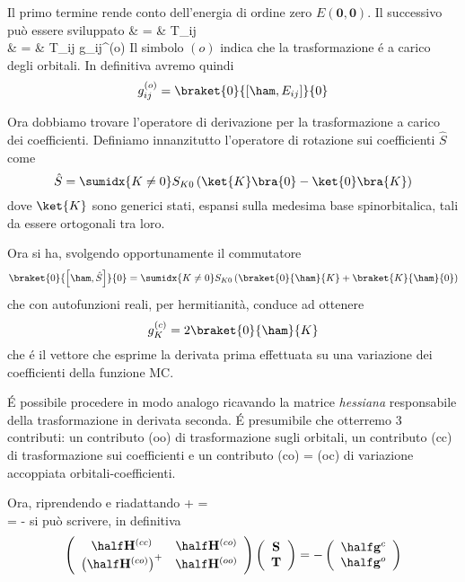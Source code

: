 Il primo termine rende conto dell'energia di ordine zero
$E(\mathbf{0},\mathbf{0})$. Il successivo pu\`o essere sviluppato
\beqas
{} & = &  T_{ij}
 \\
%
& = &  T_{ij} g_{ij}^{(o)}
\eeqas
Il simbolo $(o)$ indica che la trasformazione \'e a carico degli
orbitali.
In definitiva avremo quindi
$$
g_{ij}^{(o)} = \braket{0}{\left[\ham,E_{ij}\right]}{0}
$$

Ora dobbiamo trovare l'operatore di derivazione per la trasformazione a
carico dei coefficienti. Definiamo innanzitutto l'operatore di rotazione
sui coefficienti $\hat{S}$ come
$$
\hat{S} = \sumidx{K\neq0} S_{K0} \left(\ket{K}\bra{0} - \ket{0}\bra{K}
\right)
$$
dove $\ket{K}$ sono generici stati, espansi sulla medesima base
spinorbitalica, tali da essere ortogonali tra loro.

Ora si ha, svolgendo opportunamente il commutatore
$$
\braket{0}{\left[\ham,\hat{S}\right]}{0} =
\sumidx{K\neq0}S_{K0} \left( \braket{0}{\ham}{K} + \braket{K}{\ham}{0}
\right)
$$
che con autofunzioni reali, per hermitianit\`a, conduce ad ottenere
$$
g_K^{(c)} = 2 \braket{0}{\ham}{K}
$$
che \'e il vettore che esprime la derivata prima effettuata su una
variazione dei coefficienti della funzione MC.

\'E possibile procedere in modo analogo ricavando la matrice
\textit{hessiana} responsabile della trasformazione in derivata seconda.
\'E presumibile che otterremo 3 contributi: un contributo (oo) di
trasformazione sugli orbitali, un contributo (cc) di trasformazione sui
coefficienti e un contributo (co) = (oc) di variazione accoppiata
orbitali-coefficienti.

Ora, riprendendo e riadattando
\beqas
{} +  =  \\
 = - 
\eeqas
si pu\`o scrivere, in definitiva
$$
\left(
\begin{array}{cc}
\half \mathbf{H}^{(cc)} & \half \mathbf{H}^{(co)} \\
\left( \half \mathbf{H}^{(co)} \right)^+ & \half \mathbf{H}^{(oo)} \\
\end{array}
\right) 
\left(
\begin{array}{c}
\mathbf{S} \\
\mathbf{T} \\
\end{array}
\right) = -
\left(
\begin{array}{c}
\half \mathbf{g}^{c} \\
\half \mathbf{g}^{o} \\
\end{array}
\right)
$$

